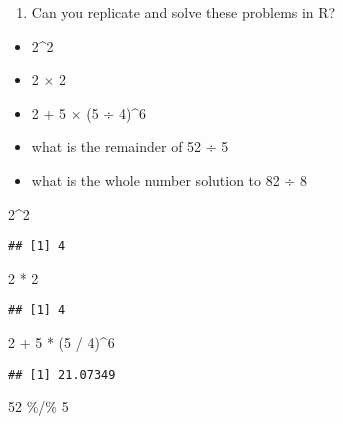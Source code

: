 \documentclass[
]{book}
\newenvironment{Shaded}{\begin{snugshade}}{\end{snugshade}}
\newcommand{\DecValTok}[1]{\textcolor[rgb]{0.00,0.00,0.81}{#1}}
\newcommand{\NormalTok}[1]{#1}
\newcommand{\SpecialCharTok}[1]{\textcolor[rgb]{0.00,0.00,0.00}{#1}}
\providecommand{\tightlist}{%
  \setlength{\itemsep}{0pt}\setlength{\parskip}{0pt}}
\begin{document}
\begin{enumerate}
\def\labelenumi{\alph{enumi}.}
\tightlist
\item
  Can you replicate and solve these problems in R?
\end{enumerate}

\begin{itemize}
\tightlist
\item
  2\^{}2
\item
  2 × 2
\item
  2 + 5 × (5 ÷ 4)\^{}6
\item
  what is the remainder of 52 ÷ 5
\item
  what is the whole number solution to 82 ÷ 8
\end{itemize}

\begin{Shaded}
\begin{Highlighting}[]
\DecValTok{2}\SpecialCharTok{\^{}}\DecValTok{2}
\end{Highlighting}
\end{Shaded}

\begin{verbatim}
## [1] 4
\end{verbatim}

\begin{Shaded}
\begin{Highlighting}[]
\DecValTok{2} \SpecialCharTok{*} \DecValTok{2}
\end{Highlighting}
\end{Shaded}

\begin{verbatim}
## [1] 4
\end{verbatim}

\begin{Shaded}
\begin{Highlighting}[]
\DecValTok{2} \SpecialCharTok{+} \DecValTok{5} \SpecialCharTok{*}\NormalTok{ (}\DecValTok{5} \SpecialCharTok{/} \DecValTok{4}\NormalTok{)}\SpecialCharTok{\^{}}\DecValTok{6}
\end{Highlighting}
\end{Shaded}

\begin{verbatim}
## [1] 21.07349
\end{verbatim}

\begin{Shaded}
\begin{Highlighting}[]
\DecValTok{52} \SpecialCharTok{\%/\%} \DecValTok{5}
\end{Highlighting}
\end{Shaded}
\end{document}
